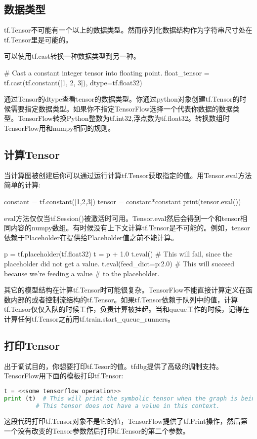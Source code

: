 \subsection{数据类型}
tf.Tensor不可能有一个以上的数据类型。然而序列化数据结构作为字符串尺寸处在tf.Tensor里是可能的。

可以使用tf.cast转换一种数据类型到另一种。
\begin{python}
# Cast a constant integer tensor into floating point.
	float_tensor = tf.cast(tf.constant([1, 2, 3]), dtype=tf.float32)
\end{python}
通过Tensor的dtype查看tensor的数据类型。你通过python对象创建tf.Tensor的时候需要指定数据类型。如果你不指定TensorFlow选择一个代表你数据的数据类型。TensorFlow转换Python整数为tf.int32,浮点数为tf.float32。转换数组时TensorFlow用和numpy相同的规则。
\subsection{计算Tensor}
当计算图被创建后你可以通过运行计算tf.Tensor获取指定的值。用Tensor.eval方法简单的计算:
\begin{python}
constant = tf.constant([1,2,3])
tensor = constant*constant
print(tensor.eval())
\end{python}
eval方法仅仅当tf.Session()被激活时可用。Tensor.eval然后会得到一个和tensor相同内容的numpy数组。有时候没有上下文计算tf.Tensor是不可能的。例如，tensor依赖于Placeholder在提供给Placeholder值之前不能计算。
\begin{python}
p = tf.placeholder(tf.float32)
t = p + 1.0
t.eval()  # This will fail, since the placeholder did not get a value.
t.eval(feed_dict={p:2.0})  # This will succeed because we're feeding a value
                           # to the placeholder.
\end{python}
其它的模型结构在计算tf.Tensor时可能很复杂。TensorFlow不能直接计算定义在函数内部的或者控制流结构的tf.Tensor。如果tf.Tensor依赖于队列中的值，计算tf.Tensor仅仅入队的时候工作，负责计算被挂起。当和queue工作的时候，记得在计算任何tf.Tensor之前用tf.train.start\_queue\_runners。
\subsection{打印Tensor}
出于调试目的，你想要打印tf.Tesor的值。tfdbg提供了高级的调制支持。TensorFlow用下面的模板打印tf.Tensor:
\begin{lstlisting}[language=Python]
t = <<some tensorflow operation>>
print (t)  # This will print the symbolic tensor when the graph is being built.
         # This tensor does not have a value in this context.
\end{lstlisting}
这段代码打印tf.Tensor对象不是它的值，TensorFlow提供了tf.Print操作，然后第一个没有改变的Tensor参数然后打印tf.Tensor的第二个参数。

